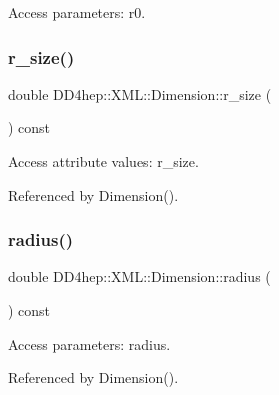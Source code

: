Access parameters\+: r0. 

\hypertarget{struct_d_d4hep_1_1_x_m_l_1_1_dimension_ab005207c99a52f50be30c66e733cbec5}{}\label{struct_d_d4hep_1_1_x_m_l_1_1_dimension_ab005207c99a52f50be30c66e733cbec5} 
\subsubsection{\texorpdfstring{r\+\_\+size()}{r\_size()}}
{\footnotesize\ttfamily double D\+D4hep\+::\+X\+M\+L\+::\+Dimension\+::r\+\_\+size (\begin{DoxyParamCaption}{ }\end{DoxyParamCaption}) const}



Access attribute values\+: r\+\_\+size. 



Referenced by Dimension().

\hypertarget{struct_d_d4hep_1_1_x_m_l_1_1_dimension_ad7c2f1de23e1c26634c63ef0251d4615}{}\label{struct_d_d4hep_1_1_x_m_l_1_1_dimension_ad7c2f1de23e1c26634c63ef0251d4615} 
\subsubsection{\texorpdfstring{radius()}{radius()}\hspace{0.1cm}{\footnotesize\ttfamily [1/2]}}
{\footnotesize\ttfamily double D\+D4hep\+::\+X\+M\+L\+::\+Dimension\+::radius (\begin{DoxyParamCaption}{ }\end{DoxyParamCaption}) const}



Access parameters\+: radius. 



Referenced by Dimension().

\hypertarget{struct_d_d4hep_1_1_x_m_l_1_1_dimension_a8aa98b87c9fc624b475bbd209d27c903}{}\label{struct_d_d4hep_1_1_x_m_l_1_1_dimension_a8aa98b87c9fc624b475bbd209d27c903} 
